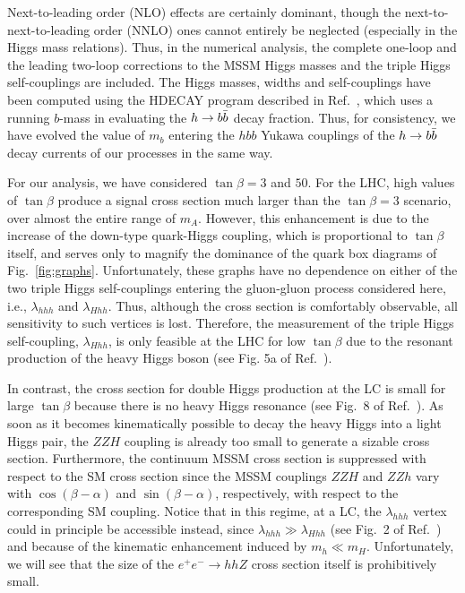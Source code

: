 Next-to-leading order (NLO) effects are certainly dominant, though the
next-to-next-to-leading order (NNLO) ones cannot entirely be neglected
(especially in the Higgs mass relations).  Thus, in the numerical
analysis, the complete one-loop and the leading two-loop corrections
to the MSSM Higgs masses and the triple Higgs self-couplings are
included.  The Higgs masses,
widths and self-couplings have been computed using the {\sc HDECAY}
program described in Ref.~\cite{hdecay1}, which uses a running $b$-mass
in evaluating the $h\rightarrow b\bar b$ decay fraction.  Thus, for
consistency, we have evolved the value of $m_b$ entering the $hbb$
Yukawa couplings of the $h\rightarrow b\bar b$ decay currents of our processes
in the same way.

For our analysis, we have considered $\tan \beta=3$ and $50$.  For the
LHC, high values of $\tan \beta$ produce a signal cross section much
larger than the $\tan\beta=3$ scenario, over almost the entire range
of $m_A$. However, this enhancement is due to the increase of the
down-type quark-Higgs coupling, which is proportional to $\tan\beta$
itself, and serves only to magnify the dominance of the quark box
diagrams of Fig.~\ref{fig:graphs}. Unfortunately, these graphs have no
dependence on either of the two triple Higgs self-couplings entering
the gluon-gluon process considered here, i.e., $\lambda_{hhh}$ and
$\lambda_{Hhh}$. Thus, although the cross section is comfortably
observable, all sensitivity to such vertices is lost. Therefore, the
measurement of the triple Higgs self-coupling, $\lambda_{Hhh}$, is only
feasible at the LHC for low $\tan \beta$ due to the resonant
production of the heavy Higgs boson (see Fig. 5a of Ref.~\cite{pp}). 

In contrast, the cross section for double Higgs production at the LC
is small for large $\tan\beta$ because there is no heavy Higgs
resonance (see Fig.~8 of Ref.~\cite{ee}). 
As soon as it becomes kinematically possible to decay the
heavy Higgs into a light Higgs pair, the $ZZH$ coupling is already too
small to generate a sizable cross section. Furthermore, the continuum
MSSM cross section is suppressed with respect to the SM cross section
since the MSSM couplings $ZZH$ and $ZZh$ vary with $\cos(\beta-\alpha)$ and
$\sin(\beta-\alpha)$, respectively, with respect to the corresponding SM
coupling. Notice that in this regime, at a LC, the $\lambda_{hhh}$
vertex could in principle be accessible instead, since
$\lambda_{hhh}\gg \lambda_{Hhh}$ (see Fig.~2 of Ref.~\cite{ee})
and because of the kinematic enhancement induced by $m_h\ll m_H$.
Unfortunately, we will see that the size of the $e^+e^-\to hhZ$ cross
section itself is prohibitively small.

